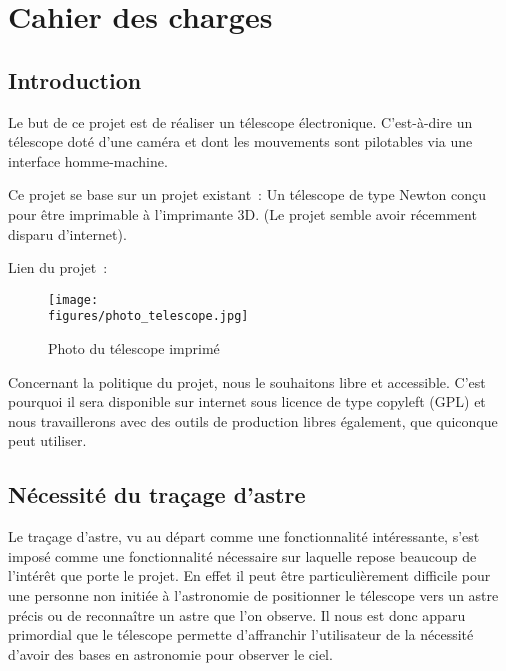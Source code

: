 \chapter{Cahier des charges}

\section{Introduction}

Le but de ce projet est de réaliser un télescope électronique. C'est-à-dire un télescope doté d'une caméra et dont les mouvements sont pilotables via une interface homme-machine.

\vspace{1cm}

Ce projet se base sur un projet existant~: Un télescope de type Newton conçu pour être imprimable à l'imprimante 3D. (Le projet semble avoir récemment disparu d'internet).

Lien du projet~: {\href{https://blog.dagoma.fr/telescope-imprime-en-3d/}{}}

\begin{figure}[H]
	\centering
    \texttt{[image: \\figures/photo\_telescope.jpg]}
    \decoRule
    \caption[
    Photo du télescope imprimé]{
    Photo du télescope imprimé}
    \label{fig:Photo du télescope imprimé}
	\end{figure}

\vspace{1cm}

Concernant la politique du projet, nous le souhaitons libre et accessible. C'est pourquoi il sera disponible sur internet sous licence de type copyleft (GPL) et nous travaillerons avec des outils de production libres également, que quiconque peut utiliser.

\section{Nécessité du traçage d'astre}

Le traçage d'astre, vu au départ comme une fonctionnalité intéressante, s'est imposé comme une fonctionnalité nécessaire sur laquelle repose beaucoup de l'intérêt que porte le projet. En effet il peut être particulièrement difficile pour une personne non initiée à l'astronomie de positionner le télescope vers un astre précis ou de reconnaître un astre que l'on observe. Il nous est donc apparu primordial que le télescope permette d'affranchir l'utilisateur de la nécessité d'avoir des bases en astronomie pour observer le ciel.

